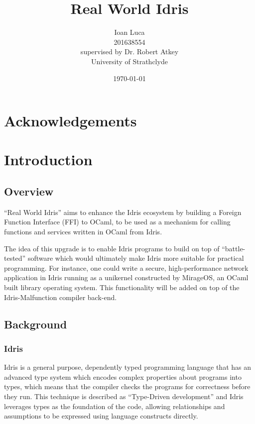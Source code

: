 \documentclass[a4paper, 12pt, oneside]{report}
\title{Real World Idris}
\author{Ioan Luca \\ 201638554 \\ \small supervised by Dr. Robert Atkey \\
	\small University of Strathclyde} %
\date{\today}
\begin{document}
\maketitle


\tableofcontents
\listoffigures
\listoftables

\chapter*{Acknowledgements}

\begin{abstract}
\end{abstract}


\chapter{Introduction}

\section{Overview}

``Real World Idris'' aims to enhance the Idris ecosystem by building a Foreign
Function Interface (FFI) to OCaml, to be used as a mechanism for calling
functions and services written in OCaml from Idris.

The idea of this upgrade is to enable Idris programs to build on top of
``battle-tested'' software which would ultimately make Idris more suitable
for practical programming.
For instance, one could write a secure, high-performance network application in Idris running as a unikernel constructed by MirageOS, an OCaml built library
operating system.
This functionality will be added on top of the Idris-Malfunction compiler
back-end.

\section{Background}

\subsection{Idris}
Idris is a general purpose, dependently typed programming language that has an
advanced type system which encodes complex properties about programs into
types, which means that the compiler checks the programs for correctness
before they run.
This technique is described as ``Type-Driven development'' and Idris leverages
types as the foundation of the code, allowing relationships and assumptions to
be expressed using language constructs directly.
\end{document}
